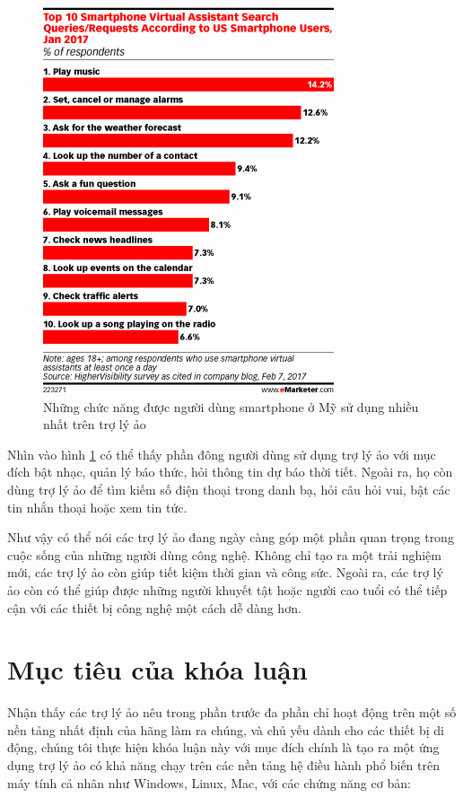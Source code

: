 \begin{figure}[h]
    \centering
    \includegraphics[scale=1]{emarketer_2}
    \caption{Những chức năng được người dùng smartphone ở Mỹ sử dụng nhiều nhất trên trợ lý ảo\cite{emarketerreport}}
    \label{fig:c1_emarketer_2}
\end{figure}

Nhìn vào hình \ref{fig:c1_emarketer_2} có thể thấy phần đông người dùng sử dụng trợ lý ảo với mục đích bật nhạc, quản lý báo thức, hỏi thông tin dự báo thời tiết. Ngoài ra, họ còn dùng trợ lý ảo để tìm kiếm số điện thoại trong danh bạ, hỏi câu hỏi vui, bật các tin nhắn thoại hoặc xem tin tức.

Như vậy có thể nói các trợ lý ảo đang ngày càng góp một phần quan trọng trong cuộc sống của những người dùng công nghệ. Không chỉ tạo ra một trải nghiệm mới, các trợ lý ảo còn giúp tiết kiệm thời gian và công sức. Ngoài ra, các trợ lý ảo còn có thể giúp được những người khuyết tật hoặc người cao tuổi có thể tiếp cận với các thiết bị công nghệ một cách dễ dàng hơn.

\section{Mục tiêu của khóa luận}

Nhận thấy các trợ lý ảo nêu trong phần trước đa phần chỉ hoạt động trên một số nền tảng nhất định của hãng làm ra chúng, và chủ yếu dành cho các thiết bị di động, chúng tôi thực hiện khóa luận này với mục đích chính là tạo ra một ứng dụng trợ lý ảo có khả năng chạy trên các nền tảng hệ điều hành phổ biến trên máy tính cả nhân như Windows, Linux, Mac, với các chứng năng cơ bản:


